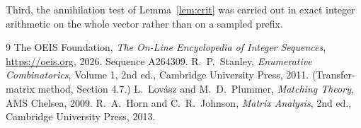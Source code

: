 \documentclass[11pt,a4paper]{article}
\theoremstyle{plain}
\theoremstyle{definition}
\begin{document}
Third, the annihilation test of Lemma~\ref{lem:crit} was carried out in exact integer
arithmetic on the whole vector rather than on a sampled prefix.

\begin{thebibliography}{9}
 The OEIS Foundation, \emph{The On-Line Encyclopedia of Integer
Sequences}, \url{https://oeis.org}, 2026. Sequence A264309.
 R.~P.~Stanley, \emph{Enumerative Combinatorics}, Volume 1, 2nd ed.,
Cambridge University Press, 2011. (Transfer-matrix method, Section 4.7.)
 L.~Lov\'asz and M.~D.~Plummer, \emph{Matching Theory}, AMS Chelsea, 2009.
 R.~A.~Horn and C.~R.~Johnson, \emph{Matrix Analysis}, 2nd ed., Cambridge
University Press, 2013.
\end{thebibliography}
\end{document}
